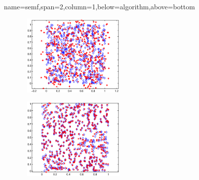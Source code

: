 \documentclass[a0paper,portrait]{baposter}
\newcommand{\bT}{\mathbb{T}}
\newcommand{\Li}{\Lambda_i}
\newcommand{\LA}{\mathcal{L}_{(\beta_1,\ \beta_2)}}
\begin{document}
\begin{poster}
{%
}

{name=semf,span=2,column=1,below=algorithm,above=bottom}{
\begin{minipage}{75mm}
\includegraphics[width=75mm,height=40mm]{r1.eps}
\end{minipage}
\begin{minipage}{75mm}
\includegraphics[width=75mm,height=40mm]{r2.eps}
\end{minipage}

}
\end{poster}
\end{document}
